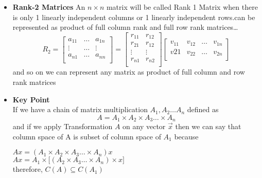 \documentclass[a4paper]{article}
\numberwithin{equation}{section}
\begin{document}
\begin{itemize}
        \item \textbf{Rank-2 Matrices}
        An $n\times n$ matrix will be called Rank 1 Matrix when there is only 1 linearly independent columns or 1 linearly independent rows.can be represented as product of full column rank and full row rank matrices\dots
            \[R_2=
                \begin{bmatrix}
                    a_{11} & \dots & a_{1n}\\
                    \vdots & \dots & \vdots \\
                    a_{n1} & \dots & a_{nn}\\
                \end{bmatrix}=
                \begin{bmatrix}
                    r_{11} & r_{12}\\
                    r_{21} & r_{12}\\
                    \vdots &  \vdots\\
                    r_{n1} & r_{n2}\\
                \end{bmatrix}
                \begin{bmatrix}
                    v_{11} & v_{12} & \dots & v_{1n}\\
                    v{21}  & v_{22} & \dots & v_{2n}\\
                \end{bmatrix}
            \]
        and so on we can represent any matrix as product of full column and row rank matrices

        \item \textbf{Key Point}\\
            If we have a chain of matrix multiplication $A_1,A_2\dots A_n$ defined as
            \[A=A_1 \times A_2 \times A_3\dots \times A_n\]
            \vspace{2pt}
            and if we apply Transformation $A$ on any vector $\vec{x}$ then we can say that column space of A is subset of column space of $A_1$ because
            \vspace{2pt}
            \begin{center}
                $Ax=(A_1 \times A_2 \times A_3\dots \times A_n)x$\\
                \vspace{3pt}
                $Ax=A_1 \times \big[(A_2 \times A_3\dots \times A_n)\times x\big]$
                \vspace{6pt}\\
                therefore, $C(A) \subseteq C(A_1) $
            \end{center}


\end{itemize}
\end{document}
